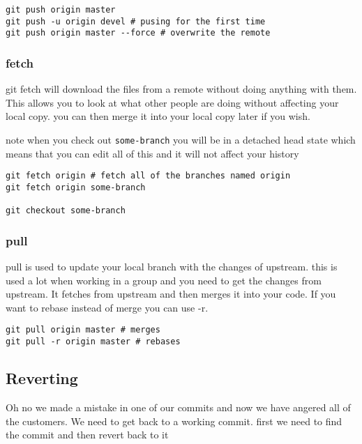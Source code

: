 \documentclass[a4paper]{article}
\begin{document}
\begin{verbatim}
git push origin master
git push -u origin devel # pusing for the first time
git push origin master --force # overwrite the remote
\end{verbatim}

\subsubsection*{fetch}
\label{sec:org2190dd3}
\begin{notes}
git fetch will download the files from a remote without doing anything with
them. This allows you to look at what other people are doing without
affecting your local copy. you can then merge it into your local copy later if
you wish.

note when you check out \texttt{some-branch} you will be in a detached head state which
means that you can edit all of this and it will not affect your history
\end{notes}

\begin{verbatim}
git fetch origin # fetch all of the branches named origin
git fetch origin some-branch

git checkout some-branch
\end{verbatim}
\subsubsection*{pull}
\label{sec:orgf881a41}
\begin{notes}
pull is used to update your local branch with the changes of upstream. this is
used a lot when working in a group and you need to get the changes from
upstream. It fetches from upstream and then merges it into your code. If you
want to rebase instead of merge you can use -r.
\end{notes}

\begin{verbatim}
git pull origin master # merges
git pull -r origin master # rebases
\end{verbatim}

\subsection*{Reverting}
\label{sec:orged5cb86}
\begin{notes}
Oh no we made a mistake in one of our commits and now we have angered all of the
customers. We need to get back to a working commit. first we need to find the
commit and then revert back to it
\end{notes}
\end{document}
